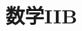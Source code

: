 \documentclass[11pt,a4paper,twocolumn]{jlreq}
\title{}
\author{}
\date{\today}
\begin{document}
\maketitle
\twocolumn[
	\tableofcontents
	\vspace{3em}
]
%
%
\section{数学IIB}

%
%
\end{document}

